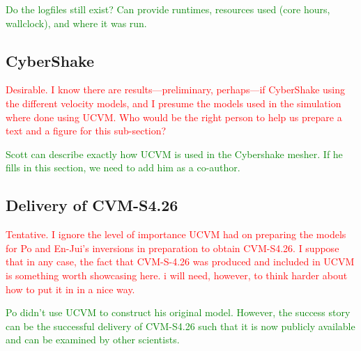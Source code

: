 \textcolor{green}{Do the logfiles still exist? Can provide runtimes, resources used (core hours, wallclock), and where it was run.}



\subsection{CyberShake}

\textcolor{red}{Desirable. I know there are results---preliminary, perhaps---if CyberShake using the different velocity models, and I presume the models used in the simulation where done using UCVM. Who would be the right person to help us prepare a text and a figure for this sub-section?}

\textcolor{green}{Scott can describe exactly how UCVM is used in the Cybershake mesher. If he fills in this section, we need to add him as a co-author.}

\subsection{Delivery of CVM-S4.26}

\textcolor{red}{Tentative. I ignore the level of importance UCVM had on preparing the models for Po and En-Jui's inversions in preparation to obtain CVM-S4.26. I suppose that in any case, the fact that CVM-S-4.26 was produced and included in UCVM is something worth showcasing here. i will need, however, to think harder about how to put it in in a nice way.}

\textcolor{green}{Po didn't use UCVM to construct his original model. However, the success story can be the successful delivery of CVM-S4.26 such that it is now publicly available and can be examined by other scientists.}
